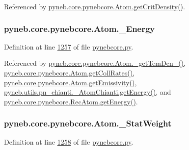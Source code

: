 Referenced by \hyperlink{pynebcore_8py_source_l01693}{pyneb.\+core.\+pynebcore.\+Atom.\+get\+Crit\+Density()}.

\hypertarget{classpyneb_1_1core_1_1pynebcore_1_1_atom_a52e68715246d258bf0a14f4bd06e89e4}{}
\subsubsection[{\+\_\+\+Energy}]{\setlength{\rightskip}{0pt plus 5cm}pyneb.\+core.\+pynebcore.\+Atom.\+\_\+\+Energy\hspace{0.3cm}{\ttfamily [private]}}\label{classpyneb_1_1core_1_1pynebcore_1_1_atom_a52e68715246d258bf0a14f4bd06e89e4}


Definition at line \hyperlink{pynebcore_8py_source_l01257}{1257} of file \hyperlink{pynebcore_8py_source}{pynebcore.\+py}.



Referenced by \hyperlink{pynebcore_8py_source_l01803}{pyneb.\+core.\+pynebcore.\+Atom.\+\_\+get\+Tem\+Den\+\_()}, \hyperlink{pynebcore_8py_source_l01329}{pyneb.\+core.\+pynebcore.\+Atom.\+get\+Coll\+Rates()}, \hyperlink{pynebcore_8py_source_l01716}{pyneb.\+core.\+pynebcore.\+Atom.\+get\+Emissivity()}, \hyperlink{pn__chianti_8py_source_l00346}{pyneb.\+utils.\+pn\+\_\+chianti.\+\_\+\+Atom\+Chianti.\+get\+Energy()}, and \hyperlink{pynebcore_8py_source_l02811}{pyneb.\+core.\+pynebcore.\+Rec\+Atom.\+get\+Energy()}.

\hypertarget{classpyneb_1_1core_1_1pynebcore_1_1_atom_a1e76c66b89eb327aeb4cdb1d8bd46fb5}{}
\subsubsection[{\+\_\+\+Stat\+Weight}]{\setlength{\rightskip}{0pt plus 5cm}pyneb.\+core.\+pynebcore.\+Atom.\+\_\+\+Stat\+Weight\hspace{0.3cm}{\ttfamily [private]}}\label{classpyneb_1_1core_1_1pynebcore_1_1_atom_a1e76c66b89eb327aeb4cdb1d8bd46fb5}


Definition at line \hyperlink{pynebcore_8py_source_l01258}{1258} of file \hyperlink{pynebcore_8py_source}{pynebcore.\+py}.



